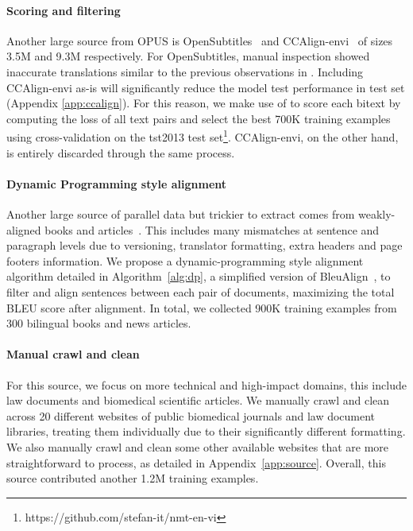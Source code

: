 \documentclass[11pt]{article}
\begin{document}
\paragraph{Scoring and filtering} Another large source from OPUS is OpenSubtitles~\cite{dataset_opensub} and CCAlign-envi~\cite{elkishky_ccaligned_2020} of sizes 3.5M and 9.3M respectively. For OpenSubtitles, manual inspection showed inaccurate translations similar to the previous observations in \citet{phomt}. Including CCAlign-envi as-is will significantly reduce the model test performance in test set (Appendix \ref{app:ccalign}). For this reason, we make use of  to score each bitext by  computing the loss of all text pairs and select the best 700K training examples using cross-validation on the tst2013 test set\footnote{https://github.com/stefan-it/nmt-en-vi}. CCAlign-envi, on the other hand, is entirely discarded through the same process. 



\paragraph{Dynamic Programming style alignment} Another large source of parallel data but trickier to extract comes from weakly-aligned books and articles~\cite{ladhak2020wikilingua}. This includes many mismatches at sentence and paragraph levels due to versioning, translator formatting, extra headers and page footers information. We propose a dynamic-programming style alignment algorithm detailed in Algorithm~\ref{alg:dp}, a simplified version of BleuAlign~\citep{bleualign}, to filter and align sentences between each pair of documents, maximizing the total BLEU score after alignment. 
In total, we collected 900K training examples from 300 bilingual books and news articles.

\paragraph{Manual crawl and clean} For this source, we focus on more technical and high-impact domains, this include law documents and biomedical scientific articles. We manually crawl and clean across 20 different websites of public biomedical journals and law document libraries, treating them individually due to their significantly different formatting. 
We also manually crawl and clean some other available websites that are more straightforward to process, as detailed in Appendix~\ref{app:source}. Overall, this source contributed another 1.2M training examples. 
\end{document}
